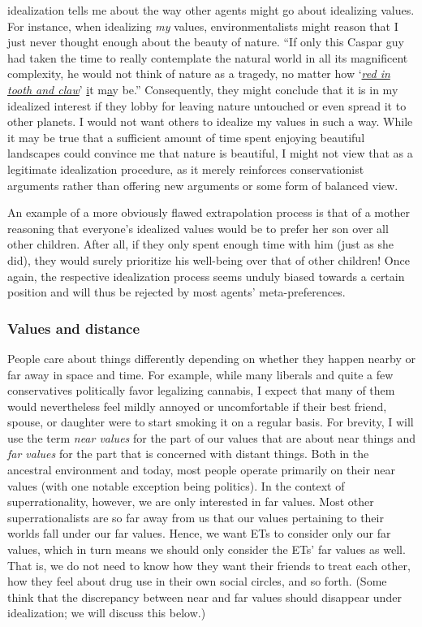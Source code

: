 idealization tells me about the way other agents might go about
idealizing values. For instance, when idealizing \emph{my} values,
environmentalists might reason that I just never thought enough about
the beauty of nature. ``If only this Caspar guy had taken the time to
really contemplate the natural world in all its magnificent complexity,
he would not think of nature as a tragedy, no matter how
`\href{https://en.wikipedia.org/wiki/In_Memoriam_A.H.H.}{\emph{red in
tooth and claw}}'
\href{https://en.wikipedia.org/wiki/In_Memoriam_A.H.H.}{i}t
m\href{https://en.wikipedia.org/wiki/In_Memoriam_A.H.H.}{a}y be.''
Consequently, they might conclude that it is in my idealized interest if
they lobby for leaving nature untouched or even spread it to other
planets. I would not want others to idealize my values in such a way.
While it may be true that a sufficient amount of time spent enjoying
beautiful landscapes could convince me that nature is beautiful, I might
not view that as a legitimate idealization procedure, as it merely
reinforces conservationist arguments rather than offering new arguments
or some form of balanced view.

An example of a more obviously flawed extrapolation process is that of a
mother reasoning that everyone's idealized values would be to prefer her
son over all other children. After all, if they only spent enough time
with him (just as she did), they would surely prioritize his well-being
over that of other children! Once again, the respective idealization
process seems unduly biased towards a certain position and will thus be
rejected by most agents' meta-preferences.

\hypertarget{values-and-distance}{\subsubsection{Values and
distance}\label{values-and-distance}}

People care about things differently depending on whether they happen
nearby or far away in space and time. For example, while many liberals
and quite a few conservatives politically favor legalizing cannabis, I
expect that many of them would nevertheless feel mildly annoyed or
uncomfortable if their best friend, spouse, or daughter were to start
smoking it on a regular basis. For brevity, I will use the term
\emph{near values} for the part of our values that are about near things
and \emph{far values} for the part that is concerned with distant
things. Both in the ancestral environment and today, most people operate
primarily on their near values (with one notable exception being
politics). In the context of superrationality, however, we are only
interested in far values. Most other superrationalists are so far away
from us that our values pertaining to their worlds fall under our far
values. Hence, we want ETs to consider only our far values, which in
turn means we should only consider the ETs' far values as well. That is,
we do not need to know how they want their friends to treat each other,
how they feel about drug use in their own social circles, and so forth.
(Some think that the discrepancy between near and far values should
disappear under idealization; we will discuss this below.)

